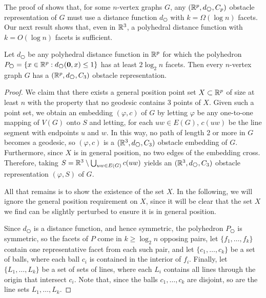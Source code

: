 \documentclass{patmorin}
\begin{document}
The proof of  shows that, for some $n$-vertex
graphs $G$, any $(\R^p, d_{\hexagon}, C_p)$ obstacle representation of $G$
must use a distance function $d_{\hexagon}$ with $k=\Omega(\log n)$ facets.
Our next result shows that, even in $\mathbb{R}^3$, a polyhedral distance function with $k=O(\log n)$ facets is sufficient.

\begin{thm}
   Let $d_{\hexagon}$ be any polyhedral distance function in $\mathbb{R}^p$ for
   which the polyhedron $P_{\hexagon}=\{x\in\R^p:d_{\hexagon}(\mathbf{0},x)\le
   1\}$ has at least $2\log_2 n$ facets.  Then every $n$-vertex graph $G$
   has a $(\R^p,d_{\hexagon},C_3)$ obstacle representation.
\end{thm}

\begin{proof}
   We claim that there exists a general position point set $X\subset\mathbb{R}^p$
   of size at least $n$ with the property that no geodesic contains
   3 points of $X$.  Given such a point set, we obtain an embedding
   $(\varphi,c)$  of $G$ by letting $\varphi$ be any one-to-one mapping
   of $V(G)$ onto $S$ and letting, for each $uw\in E(G)$, $c(uw)$ be
   the line segment with endpoints $u$ and $w$.  In this way, no path
   of length 2 or more in $G$ becomes a geodesic, so $(\varphi,c)$ is
   a $(\R^3,d_{\hexagon},C_3)$ obstacle embedding of $G$.  Furthermore,
   since $X$ is in general position, no two edges of the embedding cross.
   Therefore, taking $S=\mathbb{R}^3\setminus \bigcup_{uw\in E(G)} c(uw)$ yields
   an $(\R^3,d_{\hexagon},C_3)$ obstacle representation $(\varphi,S)$
   of $G$.

   All that remains is to show the existence of the set $X$.  In the
   following, we will ignore the general position requirement on $X$,
   since it will be clear that the set $X$ we find can be slightly
   perturbed to ensure it is in general position.

   Since $d_{\hexagon}$ is a distance function, and hence symmetric,
   the polyhedron $P_{\hexagon}$ is symmetric, so the facets of $P$
   come in $k\ge \log_2 n$ opposing pairs, let $\{f_1,\ldots,f_{k}\}$
   contain one representative facet from each such pair, and let
   $\{c_1,\ldots,c_{k}\}$ be a set of balls, where each ball $c_i$ is
   contained in the interior of $f_i$. Finally, let $\{L_1,\ldots,L_{k}\}$
   be a set of sets of lines, where each $L_i$ contains all lines
   through the origin that intersect $c_i$.  Note that, since the
   balls $c_1,\ldots,c_{k}$ are disjoint, so are the line sets
   $L_1,\ldots,L_{k}$.


\end{proof}
\end{document}
